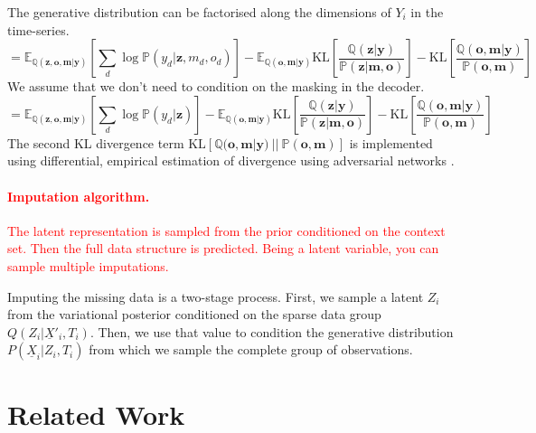 \documentclass[a4paper,12pt,twoside,openright]{article}
\newcommand{\crit}[1]{\textcolor{red}{#1}}
\begin{document}
The generative distribution can be factorised along the dimensions of $Y_i$ in the time-series.
\begin{equation*}
    = \mathbb{E}_{\mathbb{Q}(\mathbf{z}, \mathbf{o}, \mathbf{m} | \mathbf{y})} \left[ \sum_{d} \log \mathbb{P}(y_d | \mathbf{z}, m_d, o_d) \right] - \mathbb{E}_{\mathbb{Q}(\mathbf{o}, \mathbf{m} | \mathbf{y})} \mathrm{KL} \left[ \frac{\mathbb{Q}(\mathbf{z} | \mathbf{y})}{\mathbb{P}(\mathbf{z} | \mathbf{m}, \mathbf{o})} \right] - \mathrm{KL} \left[ \frac{\mathbb{Q}(\mathbf{o}, \mathbf{m}| \mathbf{y})}{\mathbb{P}(\mathbf{o} , \mathbf{m})} \right]
\end{equation*}
We assume that we don't need to condition on the masking in the decoder.
\begin{equation*}
    = \mathbb{E}_{\mathbb{Q}(\mathbf{z}, \mathbf{o}, \mathbf{m} | \mathbf{y})} \left[ \sum_{d} \log \mathbb{P}(y_d | \mathbf{z}) \right] - \mathbb{E}_{\mathbb{Q}(\mathbf{o}, \mathbf{m} | \mathbf{y})} \mathrm{KL} \left[ \frac{\mathbb{Q}(\mathbf{z} | \mathbf{y})}{\mathbb{P}(\mathbf{z} | \mathbf{m}, \mathbf{o})} \right] - \mathrm{KL} \left[ \frac{\mathbb{Q}(\mathbf{o}, \mathbf{m}| \mathbf{y})}{\mathbb{P}(\mathbf{o} , \mathbf{m})} \right]
\end{equation*}
The second KL divergence term $\mathrm{KL} \left[ \mathbb{Q}(\mathbf{o}, \mathbf{m}| \mathbf{y}) ~||~ \mathbb{P}(\mathbf{o} , \mathbf{m}) \right]$ is implemented using differential, empirical estimation of divergence using adversarial networks \parencite{nowozinFGANTrainingGenerative2016,sreekumarNeuralEstimationStatistical2022}.

\crit{\paragraph{Imputation algorithm.} The latent representation is sampled from the prior conditioned on the context set. Then the full data structure is predicted. Being a latent variable, you can sample multiple imputations.}

Imputing the missing data is a two-stage process. First, we sample a latent $Z_i$ from the variational posterior conditioned on the sparse data group $Q(Z_i | \underline{X}'_i, T_i)$. Then, we use that value to condition the generative distribution $P(\underline{X}_i | Z_i, T_i)$ from which we sample the complete group of observations.

\section{Related Work}
\end{document}
